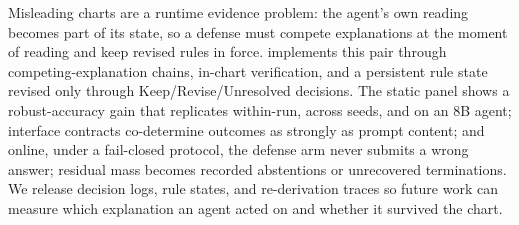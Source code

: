 Misleading charts are a runtime evidence problem: the
agent's own reading becomes part of its state, so a
defense must compete explanations at the moment of
reading and keep revised rules in force.
\ours{} implements this pair through
competing-explanation chains, in-chart verification,
and a persistent rule state revised only through
Keep/Revise/Unresolved decisions.
The static panel shows a robust-accuracy gain that
replicates within-run, across seeds, and on an 8B
agent; interface contracts co-determine outcomes as
strongly as prompt content; and online, under a
fail-closed protocol, the defense arm never submits a
wrong answer; residual mass becomes recorded
abstentions or unrecovered terminations.
We release decision logs, rule states, and
re-derivation traces so future work can measure which
explanation an agent acted on and whether it survived
the chart.